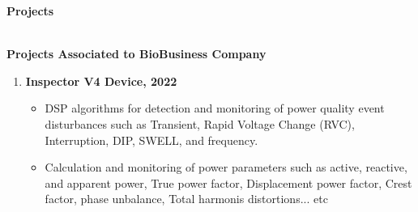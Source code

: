 \documentclass[a4paper,12pt,final]{memoir}
\newcommand{\SmallSep}{\vspace{0.5em}}
\newcommand{\CVSection}[1]
	{\Large\textbf{#1}\par
	\SmallSep\normalsize\normalfont}
\newcommand{\CVItem}[1]
	{\textbf{\color{RoyalBlue} #1}}
\begin{document}
\clearpage
\framebreak
\framebreak

\CVSection{Projects}\\
\CVItem{Projects Associated to BioBusiness Company}
\begin{enumerate}
\item \textbf{Inspector V4 Device, 2022} 
\begin{itemize}
\item DSP algorithms for detection and monitoring of power quality event disturbances such as Transient, Rapid Voltage Change (RVC), Interruption, DIP, SWELL, and frequency.
\item Calculation and monitoring of power parameters such as active, reactive, and apparent power, True power factor, Displacement power factor, Crest factor, phase unbalance, Total harmonis distortions... etc
\end{itemize}


\end{enumerate}
\end{document}

